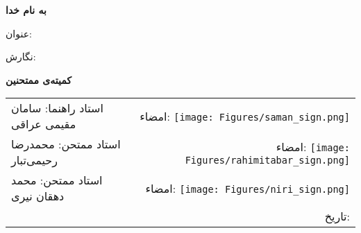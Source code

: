 
\pagestyle{empty}

\begin{large}
\setlength{\parindent}{0pt}
\begin{center}

{\large\bf به نام خدا}

\ThesisUniversity

\vspace{-0.1cm}
\ThesisDepartment

\vspace{2.5em}
\textbf{\large\ThesisType}

\end{center}

\vspace{3em}

{\large عنوان: \ThesisTitle}

\vspace{.3em}

{\large نگارش: \ThesisAuthor}

\textbf{کمیته‌ی ممتحنین}

\begin{tabular}{p{7cm}r}
استاد راهنما: سامان مقیمی عراقی & امضاء:
\texttt{[image: Figures/saman\_sign.png]}
 \\[1em]
استاد ممتحن: محمدرضا رحیمی‌تبار& امضاء:
\texttt{[image: Figures/rahimitabar\_sign.png]}
\\[1em]
استاد ممتحن: محمد دهقان نیری & امضاء:
\texttt{[image: Figures/niri\_sign.png]}
 \\[1em]
& تاریخ:
\end{tabular}

\end{large}

\newpage
